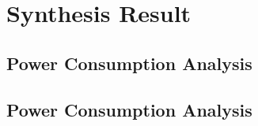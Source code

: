 \section{Synthesis Result}
{
    \subsection{Power Consumption Analysis}
    \subsection{Power Consumption Analysis}
}


